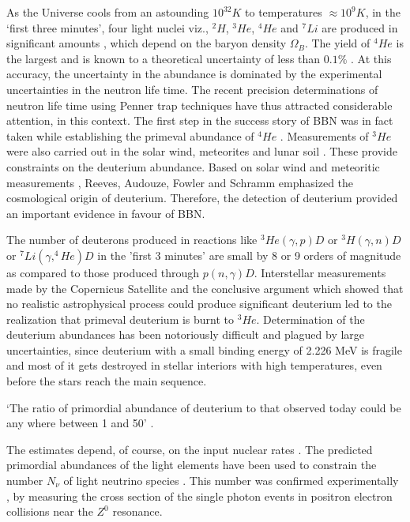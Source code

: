 As the Universe cools from an astounding $10^{32}K$ to temperatures $\approx 10^9K$, in the `first three minutes', four light nuclei viz., $^2H$, $^3He$, $^4He$ and $^7Li$ are produced in significant amounts \cite{chap34-key1,chap34-key2}, which depend on the baryon density $\Omega_B$. The yield of $^4He$ is the largest and is known to a theoretical uncertainty of less than $0.1\%$ \cite{chap34-key3}. At this accuracy, the uncertainty in the abundance is dominated by the experimental uncertainties in the neutron life time. The recent precision determinations \cite{chap34-key4} of neutron life time using Penner trap techniques have thus attracted considerable attention, in this context.  The first step in the success story of BBN was in fact taken while establishing the primeval abundance of $^4He$ \cite{chap34-key5}.  Measurements of $^3He$ were also carried out in the solar wind, meteorites and lunar soil \cite{chap34-key6}. These  provide constraints \cite{chap34-key7} on the deuterium abundance. Based on solar wind and meteoritic measurements \cite{chap34-key8}, Reeves, Audouze, Fowler and Schramm \cite{chap34-key9} emphasized the cosmological origin of deuterium. Therefore, the detection of deuterium provided an important evidence in favour of BBN.

The number of deuterons produced in reactions like $^3He(\gamma,p)D$ or $^3H(\gamma,n)D$ or $^7Li(\gamma,^4He)D$ in the 'first 3 minutes' are small by 8 or 9 orders of magnitude \cite{chap34-key10} as compared to those produced through $p(n,\gamma)D$. Interstellar measurements \cite{chap34-key11} made by the Copernicus Satellite and the conclusive  argument \cite{chap34-key12} which showed that no realistic astrophysical process could produce significant deuterium led to the realization that primeval deuterium is burnt to $^3He$. Determination of the deuterium abundances has been notoriously difficult and plagued by large uncertainties, since deuterium with a small binding energy of 2.226 MeV is fragile and most of it gets destroyed in stellar interiors with high temperatures, even before the stars reach the main sequence.

`The ratio of primordial abundance of deuterium to that observed today could be any where between 1 and 50' \cite{chap34-key10}.
 
The estimates depend, of course, on the input nuclear rates \cite{chap34-key13}. The predicted primordial abundances of the light elements have been used to constrain the number $N_\nu$ of light neutrino species \cite{chap34-key1}. This number was confirmed experimentally \cite{chap34-key14}, by measuring the cross section of the single photon events in positron electron collisions near the $Z^0$ resonance. 
\newpage

